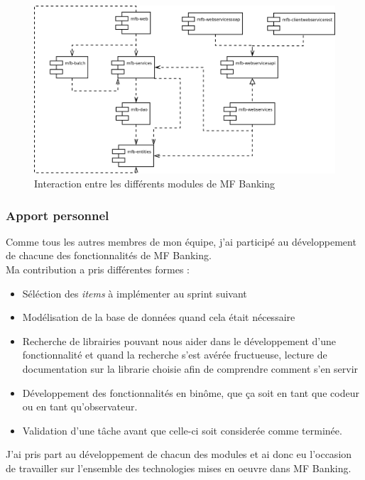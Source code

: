 \begin{figure}[h!]
	\centering
		\includegraphics[scale=0.3]{diagramme_modules.png}
	\caption{Interaction entre les différents modules de MF Banking}
\end{figure}

\subsubsection{Apport personnel}

Comme tous les autres membres de mon équipe, j'ai participé au développement de chacune des fonctionnalités de MF Banking.\\
Ma contribution a pris différentes formes :
\begin{itemize}
	\item Séléction des \textit{items} à implémenter au sprint suivant
	\item Modélisation de la base de données quand cela était nécessaire
	\item Recherche de librairies pouvant nous aider dans le développement d'une fonctionnalité et quand la recherche s'est avérée fructueuse, lecture de documentation sur la librarie choisie afin de comprendre comment s'en servir
	\item Développement des fonctionnalités en binôme, que ça soit en tant que codeur ou en tant qu'observateur.
	\item Validation d'une tâche avant que celle-ci soit considerée comme terminée.\\
\end{itemize}

J'ai pris part au développement de chacun des modules et ai donc eu l'occasion de travailler sur l'ensemble des technologies mises en oeuvre dans MF Banking.\\

